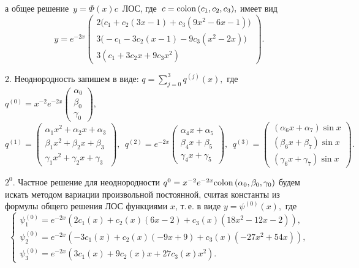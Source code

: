 \documentclass[11pt]{article}
\begin{document}
{%
а общее решение \,$y=\Phi(x)c$\, ЛОС, где \,$c={\rm colon}\,(c_1,c_2,c_3),$ имеет вид
\[
y=e^{-2x}\begin{pmatrix} 
2\big(c_1 + c_2 (3x - 1) + c_3 (9x^2 - 6x - 1)\big) \\ 
3\big( -c_1-3c_2 (x-1) - 9c_3 (x^2 - 2x)\big) \\ 
3(c_1 + 3c_2x + 9c_3x^2) 
\end{pmatrix}.
\]

2. Неоднородность %
запишем в виде:
$\displaystyle q=\sum_{j=0}^3 q^{(j)}(x),$ где $q^{(0)}=x^{-2}e^{-2x}\begin{pmatrix}\alpha_0\\ \beta_0\\ \gamma_0\end{pmatrix},$ 
%
$q^{(1)}=\begin{pmatrix} \alpha_1 x^2+\alpha_2 x+\alpha_3\\ \beta_1 x^2+\beta_2 x+\beta_3\\ \gamma_1 x^2+\gamma_2 x+\gamma_3 \end{pmatrix},\ \ 
q^{(2)}=e^{-2x} \begin{pmatrix} \alpha_4 x + \alpha_5 \\ \beta_4 x + \beta_5 \\ \gamma_4 x + \gamma_5 \end{pmatrix},\ \ 
q^{(3)}=\begin{pmatrix} (\alpha_6 x + \alpha_7) \sin x \\ (\beta_6 x + \beta_7) \sin x \\ (\gamma_6 x + \gamma_7) \sin x \end{pmatrix}.$

\smallskip
$2^0.$ Частное решение для неоднородности $q^{0} = x^{-2} e^{-2x} {\rm colon}\,(\alpha_0,\beta_0,\gamma_0)$ 
будем искать методом вариации произвольной постоянной, считая константы из формулы общего решения ЛОС функциями $x$, 
т.\,е. в виде $y=\psi^{(0)}(x),$ где \[
\begin{cases}
\psi_1^{(0)} = e^{-2x} \left( 2c_1(x) + c_2(x)(6x - 2) + c_3(x)(18x^2 - 12x - 2) \right), \\
\psi_2^{(0)} = e^{-2x} \left( -3c_1(x) + c_2(x)(-9x + 9) + c_3(x)(-27x^2 + 54x) \right), \\
\psi_3^{(0)} = e^{-2x} \left( 3c_1(x) + 9c_2(x)x + 27c_3(x)x^2 \right).
\end{cases}
\]

}
\end{document}

